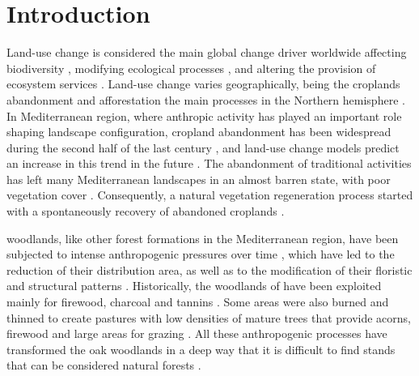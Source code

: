\newpage

\section{Introduction}\label{sec:coloniza:intro}

Land-use change is considered the main global change driver worldwide \autocites{Butchartetal2010GlobalBiodiversity,Winkleretal2021GlobalLand} affecting biodiversity \autocites{Sala2000GlobalBiodiversity}, modifying ecological processes \autocites{Lindenmayeretal2012LandUse}, and altering the provision of ecosystem services \autocites{Hasanetal2020ImpactLand}. Land-use change varies geographically, being the croplands abandonment and afforestation the main processes in the Northern hemisphere \autocites{Winkleretal2021GlobalLand,ReyBenayas2007AbandonmentAgricultural}. In Mediterranean region, where anthropic activity has played an important role shaping landscape configuration, cropland abandonment has been widespread during the second half of the last century \autocites{Piasetal2014ColonizationAbandoned,ValbuenaCarabanaetal2010HistoricalRecent}, and land-use change models predict an increase in this trend in the future \autocites{Rounsevelletal2006CoherentSet,PerpinaCastilloetal2021ModellingAgricultural}. The abandonment of traditional activities has left many Mediterranean landscapes in an almost barren state, with poor vegetation cover \autocites{Sheffer2012ReviewDevelopment, ReyBenayas2007AbandonmentAgricultural}. Consequently, a natural vegetation regeneration process started with a spontaneously recovery of abandoned croplands \autocites{Debusscheetal1999MediterraneanLandscape,PenuelasBoada2003GlobalChangeinduced,AlvarezMartinezetal2014InfluenceLand,Nataleetal2007StudyTree,Piussi2000ExpansionEuropean}. 

\Qpy woodlands, like other forest formations in the Mediterranean region, have been subjected to intense anthropogenic pressures over time \autocites{GarciaJimenez20099230Robledales, AlbaSanchezetal2021EarlyAnthropogenic}, which have led to the reduction of their distribution area, as well as to the modification of their floristic and structural patterns \autocites{Gavilanetal2000EffectsDisturbance,Calvoetal1999PostfireSuccession,Tarregaetal2006ForestStructure}. Historically, the woodlands of \Qp have been exploited mainly for firewood, charcoal and tannins \autocites{RuizdelaTorre2006FloraMayor,SanchezPalomaresetal2008EstacionesEcologicas}. Some areas were also burned and thinned to create pastures with low densities of mature trees that provide acorns, firewood and large areas for grazing \autocites{HerreraCalvo2016UsoPastoral,Alvarezetal2009CambiosEstructura,ValbuenaCarabanaGil2017CentenaryCoppicing}. All these anthropogenic processes have transformed the oak woodlands in a deep way that it is difficult to find stands that can be considered natural forests \autocites{RuizdelaTorre2006FloraMayor}. 

